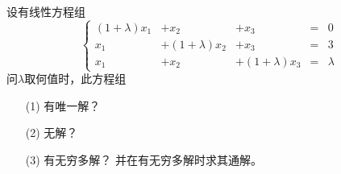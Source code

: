 \begin{frame}
  \begin{li}[$\bigstar$]
    设有线性方程组
    $$
    \left\{
      \begin{array}{rrrcr}
        (1+\lambda)x_1&+x_2&+x_3&=&0\\[0.05in]
        x_1&+(1+\lambda)x_2&+x_3&=&3\\[0.05in]
        x_1&+x_2&+(1+\lambda)x_3&=&\lambda
      \end{array}
    \right.
    $$
    问$\lambda$取何值时，此方程组
    \begin{itemize}
    \item[(1)]有唯一解？
    \item[(2)]无解？ 
    \item[(3)]有无穷多解？ 并在有无穷多解时求其通解。
    \end{itemize}
  \end{li}
\end{frame}

